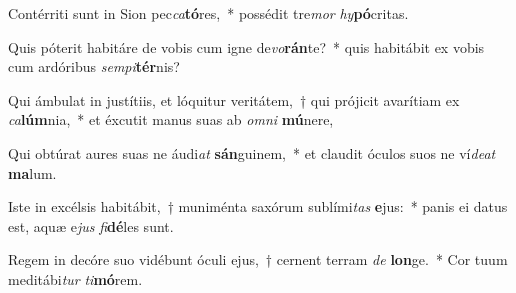 \item Contérriti sunt in Sion pec\textit{ca}\textbf{tó}res,~* possédit tre\textit{mor} \textit{hy}\textbf{pó}critas.
\item Quis póterit habitáre de vobis cum igne de\textit{vo}\textbf{rán}te?~* quis habitábit ex vobis cum ardóribus \textit{sem}\textit{pi}\textbf{tér}nis?
\item Qui ámbulat in justítiis, et lóquitur veritátem,~† qui prójicit avarítiam ex \textit{ca}\textbf{lúm}nia,~* et éxcutit manus suas ab \textit{om}\textit{ni} \textbf{mú}nere,
\item Qui obtúrat aures suas ne áudi\textit{at} \textbf{sán}guinem,~* et claudit óculos suos ne ví\textit{de}\textit{at} \textbf{ma}lum.
\item Iste in excélsis habitábit,~† muniménta saxórum sublími\textit{tas} \textbf{e}jus:~* panis ei datus est, aquæ e\textit{jus} \textit{fi}\textbf{dé}les sunt.
\item Regem in decóre suo vidébunt óculi ejus,~† cernent terram \textit{de} \textbf{lon}ge.~* Cor tuum meditábi\textit{tur} \textit{ti}\textbf{mó}rem.

